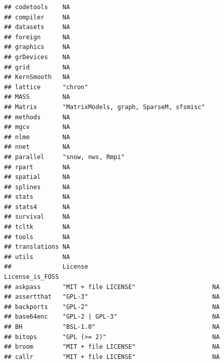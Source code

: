 \documentclass[]{article}
\begin{document}
\begin{verbatim}
## codetools    NA                                                        
## compiler     NA                                                        
## datasets     NA                                                        
## foreign      NA                                                        
## graphics     NA                                                        
## grDevices    NA                                                        
## grid         NA                                                        
## KernSmooth   NA                                                        
## lattice      "chron"                                                   
## MASS         NA                                                        
## Matrix       "MatrixModels, graph, SparseM, sfsmisc"                   
## methods      NA                                                        
## mgcv         NA                                                        
## nlme         NA                                                        
## nnet         NA                                                        
## parallel     "snow, nws, Rmpi"                                         
## rpart        NA                                                        
## spatial      NA                                                        
## splines      NA                                                        
## stats        NA                                                        
## stats4       NA                                                        
## survival     NA                                                        
## tcltk        NA                                                        
## tools        NA                                                        
## translations NA                                                        
## utils        NA                                                        
##              License                                  License_is_FOSS
## askpass      "MIT + file LICENSE"                     NA             
## assertthat   "GPL-3"                                  NA             
## backports    "GPL-2"                                  NA             
## base64enc    "GPL-2 | GPL-3"                          NA             
## BH           "BSL-1.0"                                NA             
## bitops       "GPL (>= 2)"                             NA             
## broom        "MIT + file LICENSE"                     NA             
## callr        "MIT + file LICENSE"                     NA             

\end{verbatim}
\end{document}

